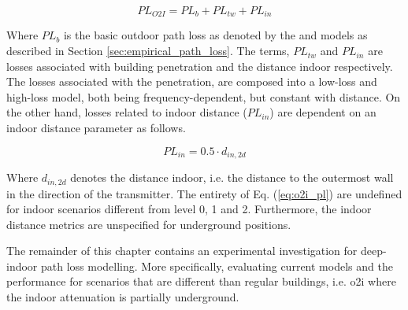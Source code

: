 \begin{equation}\label{eq:o2i_pl}
    PL_{O2I} = PL_{b} + PL_{tw} + PL_{in}
\end{equation}

Where $PL_{b}$ is the basic outdoor path loss as denoted by the  and  models as described in Section \ref{sec:empirical_path_loss}. The terms, $PL_{tw}$ and $PL_{in}$ are losses associated with building penetration and the distance indoor respectively. The losses associated with the penetration, are composed into a low-loss and high-loss model, both being frequency-dependent, but constant with distance.  On the other hand, losses related to indoor distance ($PL_{in}$) are dependent on an indoor distance parameter as follows.

\begin{equation}\label{eq:o2i_pl_in}
    PL_{in} = 0.5 \cdot d_{in,2d}
\end{equation}

Where $d_{in,2d}$ denotes the distance indoor, i.e. the distance to the outermost wall in the direction of the transmitter. The entirety of Eq. (\ref{eq:o2i_pl}) are undefined for indoor scenarios different from level 0, 1 and 2. Furthermore, the indoor distance metrics are unspecified for underground positions. 

The remainder of this chapter contains an experimental investigation for deep-indoor path loss modelling. More specifically, evaluating current models and the performance for scenarios that are different than regular buildings, i.e. \gls{o2i} where the indoor attenuation is partially underground. 

